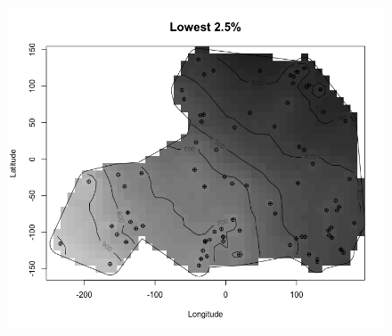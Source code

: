 \documentclass[12pt]{article}
\makeatletter
\theoremstyle{homework}
\newenvironment{exercise}[1]
{\def\@currentlabel{#1}\exercisecore}
{\endexercisecore}
\makeatother
\begin{document}
\begin{exercise}{3}
\begin{figure}[H]
\begin{center}
    \end{center}
  \end{figure}
  \begin{figure}[H]
    \begin{center}
    \includegraphics[width = \textwidth]{Rplot11.png}
    \end{center}
  \end{figure}


\end{exercise}
\end{document}
